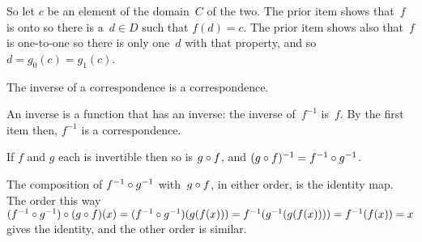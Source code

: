 \documentclass{test}  %
\begin{document}
\begin{problem}
\begin{exes}
\begin{answer}
  So let $c$ be an element of the domain~$C$ of the two.
  The prior item shows that~$f$ is onto so there is a~$d\in D$ such that
  $f(d)=c$.
  The prior item shows also that~$f$ is one-to-one so there is only 
  one~$d$ with that property, and so $d=g_0(c)=g_1(c)$.  
\end{answer}
\begin{exercise} 
  The inverse of a correspondence is a correspondence.  
\end{exercise}
\begin{answer}
  An inverse is a function that has an inverse: the inverse of~$f^{-1}$
  is~$f$.
  By the first item then, $f^{-1}$ is a correspondence.  
\end{answer}
\begin{exercise} 
  If $f$ and $g$ each is invertible then so is 
  $g\mathbin{\circ} f$, and $(g\mathbin{\circ} f)^{-1}=f^{-1}\mathbin{\circ} g^{-1}$.
\end{exercise}
\begin{answer}
  The composition of $f^{-1}\mathbin{\circ} g^{-1}$ with~$g\mathbin{\circ} f$,
  in either order, is the identity map.
  The order this way  
  $(f^{-1}\mathbin{\circ} g^{-1})\mathbin{\circ} (g\mathbin{\circ} f)(x)
  =(f^{-1}\mathbin{\circ} g^{-1})(g(f(x)))
  =f^{-1}(g^{-1}(g(f(x))))
  =f^{-1}(f(x))=x$
  gives the identity,
  and the other order is similar.  
\end{answer}
\end{exes}

   

\end{problem}
\end{document}
